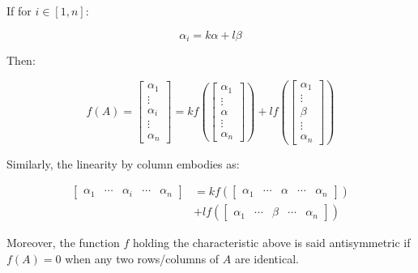 \documentclass{article}
\begin{document}
If for \(i \in [1, n]\):

\begin{equation*}
    \alpha_i=k\alpha+l\beta
\end{equation*}

Then:

\begin{equation}
f(A)=
\begin{bmatrix}
    \alpha_1 \\
    \vdots \\
    \alpha_i \\
    \vdots \\
    \alpha_n
\end{bmatrix} =
kf(
\begin{bmatrix}
    \alpha_1 \\
    \vdots \\
    \alpha \\
    \vdots \\
    \alpha_n
\end{bmatrix}) + lf(
\begin{bmatrix}
    \alpha_1 \\
    \vdots \\
    \beta \\
    \vdots \\
    \alpha_n
\end{bmatrix}
)
\end{equation}

Similarly, the linearity by column embodies as:

\begin{equation}
\begin{split}
\begin{bmatrix}
    \alpha_1 &
    \cdots &
    \alpha_i &
    \cdots &
    \alpha_n
\end{bmatrix} & =
kf(
\begin{bmatrix}
    \alpha_1 &
    \cdots &
    \alpha &
    \cdots &
    \alpha_n
\end{bmatrix}) \\
& + lf(
\begin{bmatrix}
    \alpha_1 &
    \cdots &
    \beta &
    \cdots &
    \alpha_n
\end{bmatrix}
)
\end{split}
\end{equation}

Moreover, the function \(f\) holding the characteristic above is
said antisymmetric if
\(f(A)=0\) when any two rows/columns of \(A\) are identical. 
\end{document}
